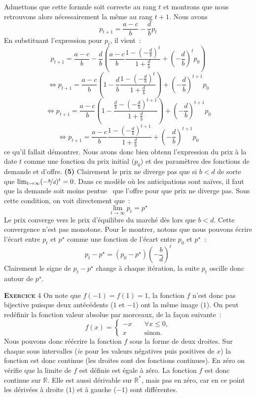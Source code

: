 \documentclass[10pt,a4paper,notitlepage]{article}
\newcommand{\exercice}[1]{\textsc{\textbf{Exercice}} #1}
\begin{document}
Admettons que cette formule soit correcte au rang $t$ et montrons que
nous retrouvons alors nécessairement la même au rang $t+1$. Nous avons
\[
p_{t+1} = \frac{a-c}{b} - \frac{d}{b}p_t
\]
En substituant l'expression pour $p_t$, il vient :
\[
p_{t+1} = \frac{a-c}{b} - \frac{d}{b}\left(\frac{a-c}{b}\frac{1-\left(-\frac{d}{b}\right)^{t}}{1+\frac{d}{b}} + \left(-\frac{d}{b}\right)^{t}p_0\right)
\]
\[
\Leftrightarrow p_{t+1} = \frac{a-c}{b} \left(1 - \frac{d}{b}\frac{1-\left(-\frac{d}{b}\right)^{t}}{1+\frac{d}{b}}\right)+ \left(-\frac{d}{b}\right)^{t+1}p_0
\]
\[
\Leftrightarrow p_{t+1} = \frac{a-c}{b} \left(1 - \frac{\frac{d}{b}-\left(-\frac{d}{b}\right)^{t+1}}{1+\frac{d}{b}}\right)+ \left(-\frac{d}{b}\right)^{t+1}p_0
\]
\[
\Leftrightarrow p_{t+1} = \frac{a-c}{b} \frac{1-\left(-\frac{d}{b}\right)^{t+1}}{1+\frac{d}{b}}+ \left(-\frac{d}{b}\right)^{t+1}p_0
\]
ce qu'il fallait démontrer. Nous avons donc bien obtenu l'expression
du prix à la date $t$ comme une fonction du prix initial ($p_0$) et
des paramètres des fonctions de demande et d'offre. \textbf{(5)}
Clairement le prix ne diverge pas que si $b<d$ de sorte que
$\lim_{t\rightarrow\infty}(-\nicefrac{b}{d})^t=0$. Dans ce modèle où
les anticipations sont naïves, il faut que la demande soit moins \og
pentue \fg\ que l'offre pour que prix ne diverge pas. Sous cette
condition, on voit directement que :
\[
\lim_{t\rightarrow\infty}p_t = p^{\star}
\]
Le prix converge vers le prix d'équilibre du marché dès lors que
$b<d$. Cette convergence n'est pas monotone. Pour le montrer, notons
que nous pouvons écrire l'écart entre $p_t$ et $p^{\star}$ comme une
fonction de l'écart entre $p_0$ et $p^{\star}$ :
\[
p_t - p^{\star} = \left(p_0-p^{\star}\right)\left(-\frac{b}{d}\right)^t
\]
Clairement le signe de $p_t-p^{\star}$ change à chaque itération, la
suite $p_t$ oscille donc autour de $p^{\star}$.

\bigskip

\exercice{4} On note que $f(-1)=f(1)=1$, la fonction $f$ n'est donc
pas bijective puisque deux antécédents ($1$ et $-1$) ont la même image
($1$). On peut redéfinir la fonction valeur absolue par morceaux, de
la façon suivante :
\[
f(x) = 
\begin{cases}
  -x& \quad\forall x\leq 0,\\
   x& \quad \text{sinon}.
\end{cases}
\]
Nous pouvons donc réécrire la fonction $f$ sous la forme de deux
droites. Sur chaque sous intervalles (\emph{ie} pour les valeurs
négatives puis positives de $x$) la fonction est donc continue (les
droites sont des fonctions continues). En zéro on vérifie que la
limite de $f$ est définie est égale à zéro. La fonction $f$ est donc
continue sur $\mathbb R$. Elle est aussi dérivable sur $\mathbb R^*$,
mais pas en zéro, car en ce point les dérivées à droite ($1$) et à
gauche ($-1$) sont différentes. 
\end{document}
